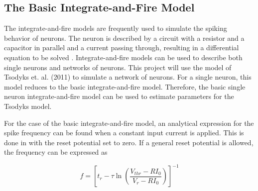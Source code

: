 \documentclass[twocolumn, a4paper,10pt, norsk]{scrartcl}
\begin{document}

\subsection*{The Basic Integrate-and-Fire Model} %

The integrate-and-fire models are frequently used to simulate the spiking behavior of neurons. %
The neuron is described by a circuit with a resistor and a capacitor in parallel and a current passing through, resulting in a differential equation to be solved \cite{i-and-f}. %
Integrate-and-fire models can be used to describe both single neurons and networks of neurons. This project will use the model of Tsodyks et. al. (2011) \cite{Tsodyks} to simulate a network of neurons. For a single neuron, this model reduces to the basic integrate-and-fire model. Therefore, the basic single neuron integrate-and-fire model can be used to estimate parameters for the Tsodyks model. %


For the case of the basic integrate-and-fire model, an analytical expression for the spike frequency can be found when a constant input current is applied. This is done in \cite{i-and-f} with the reset potential set to zero. If a general reset potential is allowed, the frequency can be expressed as

\begin{equation}
 f = \left[ t_r - \tau\ln\left(\frac{V_{thr}-RI_0}{V_{r}-RI_0}\right) \right]^{-1}
 \label{eq:frequency}
\end{equation}
\end{document}
